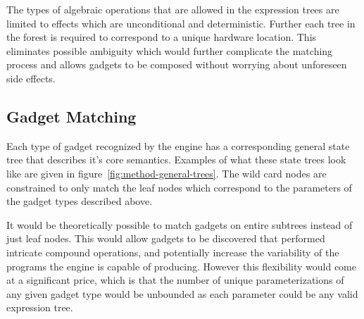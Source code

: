     The types of algebraic operations that are allowed in the expression trees
    are limited to effects which are unconditional and deterministic. Further
    each tree in the forest is required to correspond to a unique hardware
    location. This eliminates possible ambiguity which would further complicate
    the matching process and allows gadgets to be composed without worrying
    about unforeseen side effects.
    
    \subsection{Gadget Matching}

    Each type of gadget recognized by the engine has a corresponding general
    state tree that describes it's core semantics. Examples of what these state
    trees look like are given in figure~\ref{fig:method-general-trees}. The wild
    card nodes are constrained to only match the leaf nodes which correspond to
    the parameters of the gadget types described above.

    It would be theoretically possible to match gadgets on entire subtrees
    instead of just leaf nodes. This would allow gadgets to be discovered that
    performed intricate compound operations, and potentially increase the
    variability of the programs the engine is capable of producing. However this
    flexibility would come at a significant price, which is that the number of
    unique parameterizations of any given gadget type would be unbounded as each
    parameter could be any valid expression tree.

